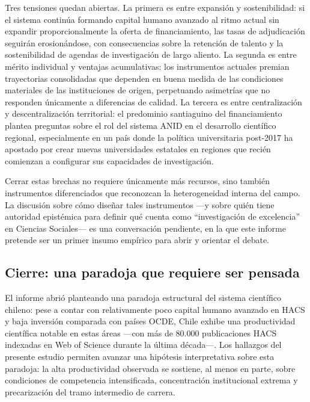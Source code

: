 \documentclass[
  spanish,
  a4paper,
  oneside]{scrbook}
\begin{document}
Tres tensiones quedan abiertas. La primera es entre expansión y
sostenibilidad: si el sistema continúa formando capital humano avanzado
al ritmo actual sin expandir proporcionalmente la oferta de
financiamiento, las tasas de adjudicación seguirán erosionándose, con
consecuencias sobre la retención de talento y la sostenibilidad de
agendas de investigación de largo aliento. La segunda es entre mérito
individual y ventajas acumulativas: los instrumentos actuales premian
trayectorias consolidadas que dependen en buena medida de las
condiciones materiales de las instituciones de origen, perpetuando
asimetrías que no responden únicamente a diferencias de calidad. La
tercera es entre centralización y descentralización territorial: el
predominio santiaguino del financiamiento plantea preguntas sobre el rol
del sistema ANID en el desarrollo científico regional, especialmente en
un país donde la política universitaria post-2017 ha apostado por crear
nuevas universidades estatales en regiones que recién comienzan a
configurar sus capacidades de investigación.

Cerrar estas brechas no requiere únicamente más recursos, sino también
instrumentos diferenciados que reconozcan la heterogeneidad interna del
campo. La discusión sobre cómo diseñar tales instrumentos ---y sobre
quién tiene autoridad epistémica para definir qué cuenta como
``investigación de excelencia'' en Ciencias Sociales--- es una
conversación pendiente, en la que este informe pretende ser un primer
insumo empírico para abrir y orientar el debate.

\subsection{Cierre: una paradoja que requiere ser
pensada}\label{cierre-una-paradoja-que-requiere-ser-pensada}

El informe abrió planteando una paradoja estructural del sistema
científico chileno: pese a contar con relativamente poco capital humano
avanzado en HACS y baja inversión comparada con países OCDE, Chile
exhibe una productividad científica notable en estas áreas ---con más de
80.000 publicaciones HACS indexadas en Web of Science durante la última
década---. Los hallazgos del presente estudio permiten avanzar una
hipótesis interpretativa sobre esta paradoja: la alta productividad
observada se sostiene, al menos en parte, sobre condiciones de
competencia intensificada, concentración institucional extrema y
precarización del tramo intermedio de carrera.
\end{document}
